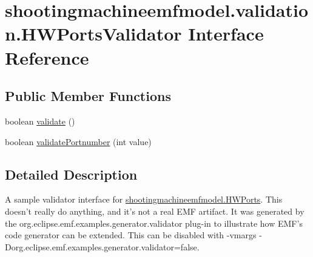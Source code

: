 \hypertarget{interfaceshootingmachineemfmodel_1_1validation_1_1_h_w_ports_validator}{\section{shootingmachineemfmodel.\-validation.\-H\-W\-Ports\-Validator Interface Reference}
\label{interfaceshootingmachineemfmodel_1_1validation_1_1_h_w_ports_validator}
}
\subsection*{Public Member Functions}
\begin{DoxyCompactItemize}
\item 
boolean \hyperlink{interfaceshootingmachineemfmodel_1_1validation_1_1_h_w_ports_validator_a52e0fbea00414ec23bcd36fbb373e428}{validate} ()
\item 
boolean \hyperlink{interfaceshootingmachineemfmodel_1_1validation_1_1_h_w_ports_validator_a6324b7c1b92c337fa99b79f893ce5dae}{validate\-Portnumber} (int value)
\end{DoxyCompactItemize}


\subsection{Detailed Description}
A sample validator interface for \hyperlink{interfaceshootingmachineemfmodel_1_1_h_w_ports}{shootingmachineemfmodel.\-H\-W\-Ports}. This doesn't really do anything, and it's not a real E\-M\-F artifact. It was generated by the org.\-eclipse.\-emf.\-examples.\-generator.\-validator plug-\/in to illustrate how E\-M\-F's code generator can be extended. This can be disabled with -\/vmargs -\/\-Dorg.\-eclipse.\-emf.\-examples.\-generator.\-validator=false. 

